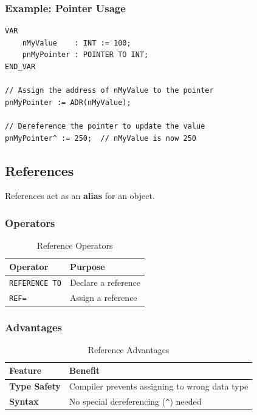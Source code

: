 \documentclass[11pt,a4paper]{article}
\begin{document}
\subsubsection*{Example: Pointer Usage}

\begin{lstlisting}
VAR
    nMyValue    : INT := 100;
    pnMyPointer : POINTER TO INT;
END_VAR

// Assign the address of nMyValue to the pointer
pnMyPointer := ADR(nMyValue);

// Dereference the pointer to update the value
pnMyPointer^ := 250;  // nMyValue is now 250
\end{lstlisting}

\subsection{References}

References act as an \textbf{alias} for an object.

\subsubsection{Operators}

\begin{table}[h]
\centering
\begin{tabular}{@{}ll@{}}
\toprule
\textbf{Operator} & \textbf{Purpose} \\
\midrule
\texttt{REFERENCE TO} & Declare a reference \\
\texttt{REF=} & Assign a reference \\
\bottomrule
\end{tabular}
\caption{Reference Operators}
\end{table}

\subsubsection{Advantages}

\begin{table}[h]
\centering
\begin{tabular}{@{}ll@{}}
\toprule
\textbf{Feature} & \textbf{Benefit} \\
\midrule
\textbf{Type Safety} & Compiler prevents assigning to wrong data type \\
\textbf{Syntax} & No special dereferencing (\texttt{\^{}}) needed \\
\bottomrule
\end{tabular}
\caption{Reference Advantages}
\end{table}
\end{document}
